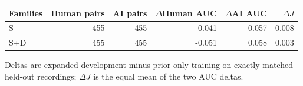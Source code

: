 \begin{tabular}{lrrrrr}
\toprule
Families & Human pairs & AI pairs & $\Delta$Human AUC & $\Delta$AI AUC & $\Delta J$ \\
\midrule
S & 455 & 455 & -0.041 & 0.057 & 0.008 \\
S+D & 455 & 455 & -0.051 & 0.058 & 0.003 \\
\bottomrule
\end{tabular}
\par\smallskip
{\footnotesize Deltas are expanded-development minus prior-only training on exactly matched held-out recordings; $\Delta J$ is the equal mean of the two AUC deltas.}
